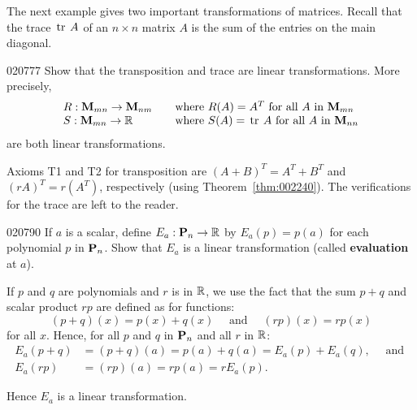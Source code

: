 The next example gives two important transformations of matrices. Recall that the trace $\thinspace\operatorname{tr \medspace}A$ of an $n \times n$ matrix $A$ is the sum of the entries on the main diagonal.


\begin{example}{}{020777}
Show that the transposition and trace are linear transformations. More precisely,
\begin{equation*}
\begin{array}{lll}
R: \textbf{M}_{mn} \to \textbf{M}_{nm} & & \mbox{where } R(A) = A^T \mbox{ for all } A \mbox{ in } \textbf{M}_{mn} \\
S: \textbf{M}_{mn} \to \mathbb{R} & & \mbox{where } S(A) = \thinspace\operatorname{tr \medspace}A \mbox{ for all } A \mbox{ in } \textbf{M}_{nn}
\end{array}
\end{equation*}
are both linear transformations.


\begin{solution}
  Axioms T1 and T2 for transposition are $(A + B)^{T} = A^{T} + B^{T}$ and $(rA)^{T} = r(A^{T})$, respectively (using Theorem~\ref{thm:002240}). The verifications for the trace are left to the reader.
\end{solution}
\end{example}

\begin{example}{}{020790}
If $a$ is a scalar, define $E_{a} : \textbf{P}_{n} \to \mathbb{R}$ by $E_{a}(p) = p(a)$ for each polynomial $p$ in $\textbf{P}_{n}$. Show that $E_{a}$ is a linear transformation (called \textbf{evaluation} at $a$).


\begin{solution}
  If $p$ and $q$ are polynomials and $r$ is in $\mathbb{R}$, we use the fact that the sum $p + q$ and scalar product $rp$ are defined as for functions:
\begin{equation*}
(p + q)(x) = p(x) + q(x) \quad \mbox{ and } \quad (rp)(x) = rp(x)
\end{equation*}
for all $x$. Hence, for all $p$ and $q$ in $\textbf{P}_{n}$ and all $r$ in $\mathbb{R}$:
\begin{align*}
E_a(p + q) &= (p + q)(a) = p(a) + q(a) = E_a(p) + E_a(q), \quad \mbox{ and } \\
E_a(rp) &= (rp)(a) = rp(a) = rE_a(p).
\end{align*}

Hence $E_{a}$ is a linear transformation.
\end{solution}
\end{example}

